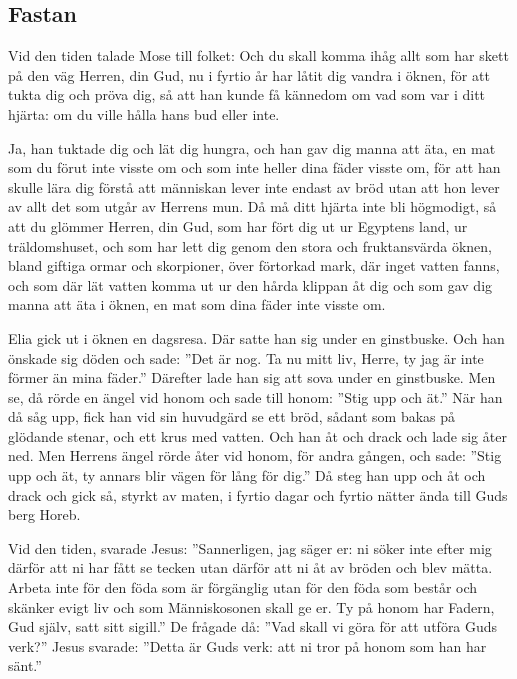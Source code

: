 \subsection{Fastan}





Vid den tiden talade Mose till folket:
Och du skall komma ihåg allt som har skett på den väg Herren, din Gud, nu i fyrtio år har låtit dig vandra i öknen, för att tukta dig och pröva dig, så att han kunde få kännedom om vad som var i ditt hjärta: om du ville hålla hans bud eller inte. 

Ja, han tuktade dig och lät dig hungra, och han gav dig manna att äta, en mat som du förut inte visste om och som inte heller dina fäder visste om, för att han skulle lära dig förstå att människan lever inte endast av bröd utan att hon lever av allt det som utgår av Herrens mun. Då må ditt hjärta inte bli högmodigt, så att du glömmer Herren, din Gud, som har fört dig ut ur Egyptens land, ur träldomshuset, och som har lett dig genom den stora och fruktansvärda öknen, bland giftiga ormar och skorpioner, över förtorkad mark, där inget vatten fanns, och som där lät vatten komma ut ur den hårda klippan åt dig och som gav dig manna att äta i öknen, en mat som dina fäder inte visste om.



Elia gick ut i öknen en dagsresa. Där satte han sig under en ginstbuske. Och han önskade sig döden och sade: ”Det är nog. Ta nu mitt liv, Herre, ty jag är inte förmer än mina fäder.” Därefter lade han sig att sova under en ginstbuske. Men se, då rörde en ängel vid honom och sade till honom: ”Stig upp och ät.” När han då såg upp, fick han vid sin huvudgärd se ett bröd, sådant som bakas på glödande stenar, och ett krus med vatten. Och han åt och drack och lade sig åter ned. Men Herrens ängel rörde åter vid honom, för andra gången, och sade: ”Stig upp och ät, ty annars blir vägen för lång för dig.” Då steg han upp och åt och drack och gick så, styrkt av maten, i fyrtio dagar och fyrtio nätter ända till Guds berg Horeb.


  Vid den tiden, svarade Jesus:
 ”Sannerligen, jag säger er: ni söker inte efter mig därför att ni har fått se tecken utan därför att ni åt av bröden och blev mätta. Arbeta inte för den föda som är förgänglig utan för den föda som består och skänker evigt liv och som Människosonen skall ge er. Ty på honom har Fadern, Gud själv, satt sitt sigill.”  De frågade då: ”Vad skall vi göra för att utföra Guds verk?” Jesus svarade: ”Detta är Guds verk: att ni tror på honom som han har sänt.”


